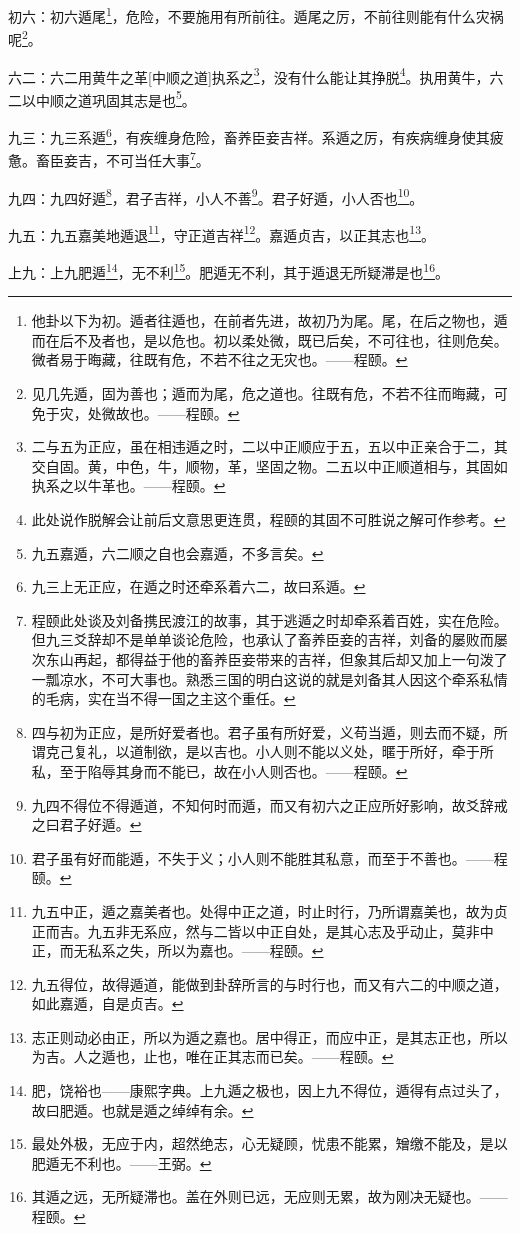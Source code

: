\documentclass[12pt,oneside]{book}
\begin{document}
初六：初六遁尾\footnote{他卦以下为初。遁者往遁也，在前者先进，故初乃为尾。尾，在后之物也，遁而在后不及者也，是以危也。初以柔处微，既已后矣，不可往也，往则危矣。微者易于晦藏，往既有危，不若不往之无灾也。——程颐。}，危险，不要施用有所前往。遁尾之厉，不前往则能有什么灾祸呢\footnote{见几先遁，固为善也；遁而为尾，危之道也。往既有危，不若不往而晦藏，可免于灾，处微故也。——程颐。}。

六二：六二用黄牛之革[中顺之道]执系之\footnote{二与五为正应，虽在相违遁之时，二以中正顺应于五，五以中正亲合于二，其交自固。黄，中色，牛，顺物，革，坚固之物。二五以中正顺道相与，其固如执系之以牛革也。——程颐。}，没有什么能让其挣脱\footnote{此处说作脱解会让前后文意思更连贯，程颐的其固不可胜说之解可作参考。}。执用黄牛，六二以中顺之道巩固其志是也\footnote{九五嘉遁，六二顺之自也会嘉遁，不多言矣。}。

九三：九三系遁\footnote{九三上无正应，在遁之时还牵系着六二，故曰系遁。}，有疾缠身危险，畜养臣妾吉祥。系遁之厉，有疾病缠身使其疲惫。畜臣妾吉，不可当任大事\footnote{程颐此处谈及刘备携民渡江的故事，其于逃遁之时却牵系着百姓，实在危险。但九三爻辞却不是单单谈论危险，也承认了畜养臣妾的吉祥，刘备的屡败而屡次东山再起，都得益于他的畜养臣妾带来的吉祥，但象其后却又加上一句泼了一瓢凉水，不可大事也。熟悉三国的明白这说的就是刘备其人因这个牵系私情的毛病，实在当不得一国之主这个重任。}。

九四：九四好遁\footnote{四与初为正应，是所好爱者也。君子虽有所好爱，义苟当遁，则去而不疑，所谓克己复礼，以道制欲，是以吉也。小人则不能以义处，暱于所好，牵于所私，至于陷辱其身而不能已，故在小人则否也。——程颐。}，君子吉祥，小人不善\footnote{九四不得位不得遁道，不知何时而遁，而又有初六之正应所好影响，故爻辞戒之曰君子好遁。}。君子好遁，小人否也\footnote{君子虽有好而能遁，不失于义；小人则不能胜其私意，而至于不善也。——程颐。}。

九五：九五嘉美地遁退\footnote{九五中正，遁之嘉美者也。处得中正之道，时止时行，乃所谓嘉美也，故为贞正而吉。九五非无系应，然与二皆以中正自处，是其心志及乎动止，莫非中正，而无私系之失，所以为嘉也。——程颐。}，守正道吉祥\footnote{九五得位，故得遁道，能做到卦辞所言的与时行也，而又有六二的中顺之道，如此嘉遁，自是贞吉。}。嘉遁贞吉，以正其志也\footnote{志正则动必由正，所以为遁之嘉也。居中得正，而应中正，是其志正也，所以为吉。人之遁也，止也，唯在正其志而已矣。——程颐。}。

上九：上九肥遁\footnote{肥，饶裕也——康熙字典。上九遁之极也，因上九不得位，遁得有点过头了，故曰肥遁。也就是遁之绰绰有余。}，无不利\footnote{最处外极，无应于内，超然绝志，心无疑顾，忧患不能累，矰缴不能及，是以肥遁无不利也。——王弼。}。肥遁无不利，其于遁退无所疑滞是也\footnote{其遁之远，无所疑滞也。盖在外则已远，无应则无累，故为刚决无疑也。——程颐。}。
\end{document}
